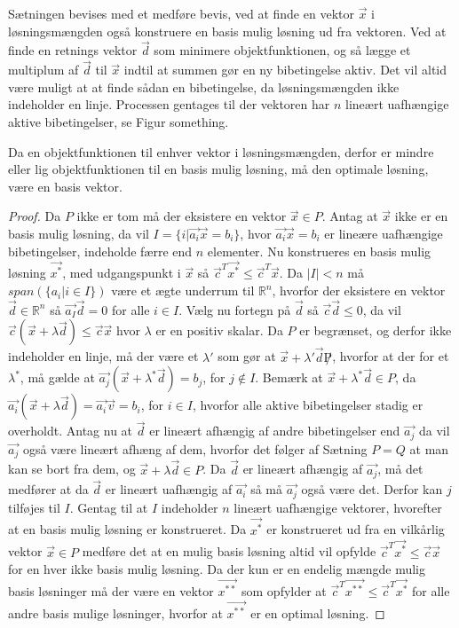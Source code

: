 Sætningen bevises med et medføre bevis, ved at finde en vektor $\vec{x}$ i løsningsmængden også konstruere en basis mulig løsning ud fra vektoren. 
Ved at finde en retnings vektor $\vec{d}$ som minimere objektfunktionen, og så lægge et multiplum af $\vec{d}$ til $\vec{x}$ indtil at summen gør en ny bibetingelse aktiv. 
Det vil altid være muligt at at finde sådan en bibetingelse, da løsningsmængden ikke indeholder en linje.
Processen gentages til der vektoren har $n$ lineært uafhængige aktive bibetingelser, se Figur something.
\begin{figure}
\begin{center}
	
	\label{fig:eksistens}
\end{center}
\end{figure}
Da en objektfunktionen til enhver vektor i løsningsmængden, derfor er mindre eller lig objektfunktionen til en basis mulig løsning, må den optimale løsning, være en basis vektor.
\begin{proof}
Da $P$ ikke er tom må der eksistere en vektor $\vec{x} \in P$.
Antag at $\vec{x}$ ikke er en basis mulig løsning, da vil $I = \{i | \vec{a_i}\vec{x} = b_i\}$, hvor $\vec{a_i}\vec{x}=b_i$ er lineære uafhængige bibetingelser, indeholde færre end $n$ elementer. 
Nu konstrueres en basis mulig løsning $\vec{x^*}$, med udgangspunkt i $\vec{x}$ så $\vec{c}^T\vec{x^*}\leq \vec{c}^T\vec{x}$.
Da $|I|<n $ må $span(\{a_i | i \in I\})$ være et ægte underrum til $\mathds{R}^n$, hvorfor der eksistere en vektor $\vec{d} \in \mathds{R}^n$ så $\vec{a_I}\vec{d}=0$ for alle $i \in I$. 
Vælg nu fortegn på $\vec{d}$ så $\vec{c}\vec{d} \leq 0$, da vil $\vec{c}(\vec{x}+\lambda\vec{d}) \leq \vec{c}\vec{x}$ hvor $\lambda$ er en positiv skalar.
Da $P$ er begrænset, og derfor ikke indeholder en linje, må der være et $\lambda '$ som gør at $\vec{x}+\lambda '\vec{d} \not P$, hvorfor at der for et $\lambda^*$, må gælde at $\vec{a_j}(\vec{x}+\lambda^* \vec{d}) = b_j$, for $j \notin I$.
Bemærk at $\vec{x}+\lambda^*\vec{d} \in P$, da $\vec{a_i}(\vec{x}+\lambda\vec{d})= \vec{a_i}\vec{v} = b_i$, for $i \in I$, hvorfor alle aktive bibetingelser stadig er overholdt.
Antag nu at $\vec{d}$ er lineært afhængig af andre bibetingelser end $\vec{a_j}$ da vil $\vec{a_j}$ også være lineært afhæng af dem, hvorfor det følger af Sætning $P=Q$ at man kan se bort fra dem, og $\vec{x}+\lambda \vec{d} \in P$. 
Da $\vec{d}$ er lineært afhængig af $\vec{a_j}$, må det medfører at da $\vec{d}$ er lineært uafhængig af $\vec{a_i}$ så må $\vec{a_j}$ også være det. 
Derfor kan $j$ tilføjes til $I$. 
Gentag til at $I$ indeholder $n$ lineært uafhængige vektorer, hvorefter at en basis mulig løsning er konstrueret.
Da $\vec{x^*}$ er konstrueret ud fra en vilkårlig vektor $\vec{x}\in P$ medføre det at en mulig basis løsning altid vil opfylde $\vec{c}^T\vec{x^*} \leq \vec{c}\vec{x}$ for en hver ikke basis mulig løsning. 
Da der kun er en endelig mængde mulig basis løsninger må der være en vektor $\vec{x^{**}}$ som opfylder at $\vec{c}^T\vec{x^{**}}\leq \vec{c}^T\vec{x^*}$ for alle andre basis mulige løsninger, hvorfor at $\vec{x^{**}}$ er en optimal løsning.
\end{proof}
